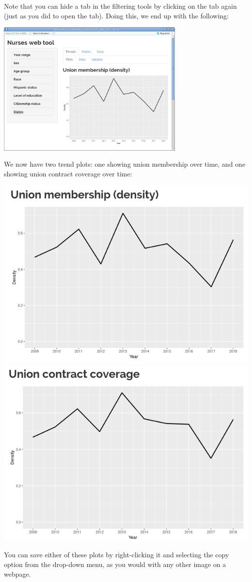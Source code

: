 \documentclass[letterpaper,12pt]{article}
\begin{document}
\begin{enumerate}
  Note that you can hide a tab in the filtering tools by clicking on
  the tab again (just as you did to open the tab). Doing this, we end
  up with the following:
  \begin{center}
    \includegraphics[width=0.7\textwidth]{images/trends_ex1/final_interface.png}
  \end{center}
  We now have two trend plots: one showing union membership over time,
  and one showing union contract coverage over time:
  \begin{center}
    \includegraphics[width=0.49\linewidth]{images/trends_ex1/membership_trend.png}
    \includegraphics[width=0.49\linewidth]{images/trends_ex1/coverage_trend.png}
  \end{center}
  You can save either of these plots by right-clicking it and
  selecting the copy option from the drop-down menu, as you would with
  any other image on a webpage.


\end{enumerate}
\end{document}
